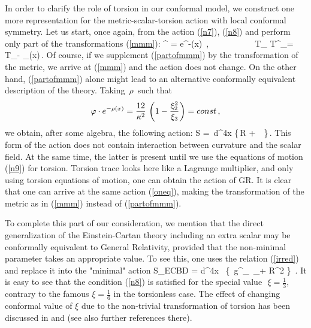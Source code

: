 In order to clarify the role of torsion 
in our conformal model, we construct one more representation 
for the 
metric-scalar-torsion action with local conformal symmetry.
Let us  start, once again, from the action (\ref{n7}), (\ref{n8})
and perform only part of the transformations (\ref{mmm}): 
\beq 
\ph\rightarrow  \ph^{\prime} = \ph \cdot e^{-\rho(x)}
\,,\, \, \, \, \, \, \, \, \, \, \, T_\al \rightarrow
T^{\prime}_\al = T_\al - 
\cdot\partial_\al\rho(x)\,.
\label{partofmmm} 
\eeq 
Of course, if we supplement
(\ref{partofmmm}) by the transformation of the metric, we arrive
at (\ref{mmm}) and the action does not change. On the other hand,
(\ref{partofmmm}) alone might lead
to an alternative conformally equivalent description of the
theory. Taking $\,\rho\,$ such that
$$
\varphi \cdot e^{-\rho(x)} =
\frac{12}{\kappa^2}\,\left(1-\frac{\xi^2_2}{\xi_3}\right)
 = const\,,
$$
we obtain, after some algebra, the following action:
\beq
 S = \,\int d^4x \;
\Big\{\,R 
+ \,
\,\Big\}\,.
\label{oneq}
\eeq
This form of the action does not contain interaction between
curvature and the scalar field. At the same time, the latter 
is present until we use the equations of motion
(\ref{n9}) for torsion.
Torsion trace looks here like a Lagrange multiplier, and only
using torsion equations of motion, one can obtain the action 
of GR. It is clear that one can arrive at the same action
(\ref{oneq}), making the transformation of the metric
as in (\ref{mmm}) instead of (\ref{partofmmm}).

 To complete this part of our consideration, we mention that
 the direct generalization
 of the Einstein-Cartan theory including an extra scalar may be
 conformally equivalent to General Relativity, provided
 that the non-minimal parameter takes an appropriate
 value. To see this, one uses the relation (\ref{irred})
  and replace it into the "minimal" action
 \beq
 S_{ECBD} =
 \int d^4x \, 
 \left\{ \,g^{\mu\nu}\partial_\mu\ph\,
 \partial_\nu\ph+\,\xi\,{\wt R}\ph^2 \right\} \,.
 \label{mini}
 \eeq
 It is easy to see that the condition (\ref{n8}) is satisfied
 for the special value $\,\,\xi =  \frac13$,
 contrary to the famous $\xi = \frac16$ in the
 torsionless case. The effect of changing conformal value of
 $\xi$ due to the non-trivial transformation of torsion
 has been discussed in \cite{payo} and \cite{anhesh} (see 
 also further references there).

